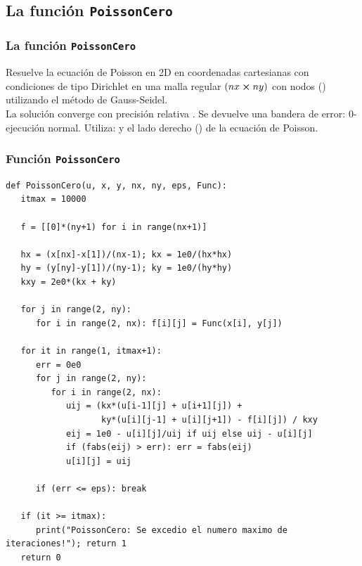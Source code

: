 \subsection*{La función \texttt{PoissonCero}}
\begin{frame}
\frametitle{La función \texttt{PoissonCero}}
Resuelve la ecuación de Poisson en 2D en coordenadas cartesianas con condiciones de tipo Dirichlet en una malla regular $(nx \cp ny)$ con nodos () utilizando el método de Gauss-Seidel.
\\
\bigskip
La solución  converge con precisión relativa . Se devuelve una bandera de error: $0$- ejecución normal. Utiliza:  y el lado derecho () de la ecuación de Poisson.
\end{frame}
\begin{frame}
\frametitle{Función \texttt{PoissonCero}}
\begin{lstlisting}[caption=Código para la función \texttt{PoissonCero}, style=FormattedNumber, basicstyle=\linespread{1.1}\ttfamily=\small, columns=fullflexible]
def PoissonCero(u, x, y, nx, ny, eps, Func):
   itmax = 10000

   f = [[0]*(ny+1) for i in range(nx+1)]

   hx = (x[nx]-x[1])/(nx-1); kx = 1e0/(hx*hx)
   hy = (y[ny]-y[1])/(ny-1); ky = 1e0/(hy*hy) 
   kxy = 2e0*(kx + ky)

   for j in range(2, ny):
      for i in range(2, nx): f[i][j] = Func(x[i], y[j])

   for it in range(1, itmax+1):
      err = 0e0
      for j in range(2, ny):
         for i in range(2, nx):
            uij = (kx*(u[i-1][j] + u[i+1][j]) +
                   ky*(u[i][j-1] + u[i][j+1]) - f[i][j]) / kxy
            eij = 1e0 - u[i][j]/uij if uij else uij - u[i][j]
            if (fabs(eij) > err): err = fabs(eij)
            u[i][j] = uij

      if (err <= eps): break

   if (it >= itmax):
      print("PoissonCero: Se excedio el numero maximo de iteraciones!"); return 1
   return 0
\end{lstlisting}
\end{frame}

